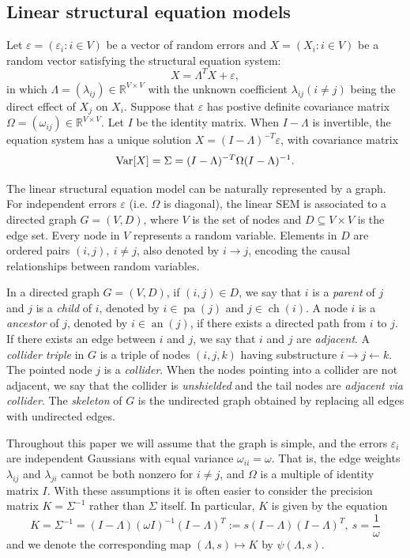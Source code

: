 \documentclass[12pt,reqno]{amsart}
\theoremstyle{plain}
\theoremstyle{definition}
\DeclareMathOperator{\pa}{pa}
\DeclareMathOperator{\an}{an}
\DeclareMathOperator{\ch}{ch}
\begin{document}
\subsection{Linear structural equation models}
Let $\varepsilon=(\varepsilon_i:i\in V)$ be a vector of random errors and $X=(X_i:i\in V)$ be a random vector satisfying the structural equation system:
$$
X=\Lambda^TX+\varepsilon,
$$
in which $\Lambda=(\lambda_{ij})\in\mathbb{R}^{V\times V}$ with the unknown coefficient $\lambda_{ij} (i\neq j)$ being the direct effect of $X_j$ on $X_i$. Suppose that $\varepsilon$ has postive definite covariance matrix $\Omega=(\omega_{ij})\in \mathbb{R}^{V\times V}$. Let $I$ be the identity matrix. When $I-\Lambda$ is invertible, the equation system has a unique solution $X=(I-\Lambda)^{-T}\varepsilon$, with covariance matrix 
$${\rm Var}[X]=\Sigma=(I-\Lambda)^{-T}\Omega(I-\Lambda)^{-1}.$$ %

The linear structural equation model can be naturally represented by a graph. For independent errors $\varepsilon$ (i.e. $\Omega$ is diagonal), the linear SEM is associated to a directed graph $G=(V,D)$, where $V$ is the set of nodes and $D\subseteq V\times V$ is the edge set. Every node in $V$ represents a random variable. Elements in $D$ are ordered pairs $(i,j),\ i\neq j$, also denoted by $i\rightarrow j$, encoding the causal relationships between random variables. 

In a directed graph $G=(V,D)$, if  $(i,j)\in D$, we say that $i$ is a \emph{parent} of $j$ and $j$ is a \emph{child} of $i$, denoted by $i\in \pa(j)$ and $j\in \ch(i)$. A node $i$ is a \emph{ancestor} of $j$, denoted by $i \in \an(j)$, if there exists a directed path from $i$ to $j$. If there exists an edge between $i$ and $j$, we say that $i$ and $j$ are \emph{adjacent}. A \emph{collider triple} in $G$ is a triple of nodes $(i,j,k)$ having substructure $i\rightarrow j \leftarrow k$. The pointed node $j$ is a \emph{collider}. When the nodes pointing into a collider are not adjacent, we say that the collider is \emph{unshielded} and the tail nodes are \emph{adjacent via collider}. The \emph{skeleton} of $G$ is the undirected graph obtained by replacing all edges with undirected edges. 

Throughout this paper we will assume that the graph is simple, and 
the errors $\varepsilon_i$ are independent Gaussians with equal variance $\omega_{ii}=\omega$. That is, the edge weights $\lambda_{ij}$ and $\lambda_{ji}$ cannot be both nonzero for $i\neq j$, and $\Omega$ is a multiple of identity matrix $I$. With these assumptions it is often easier to consider the precision matrix $K = \Sigma^{-1}$ rather than $\Sigma$ itself. In particular, $K$ is given by the equation
\[
K=\Sigma^{-1}=(I-\Lambda)(\omega I)^{-1}(I-\Lambda)^{T}:=s(I-\Lambda)(I-\Lambda)^{T},\ s=\frac{1}{\omega}
\]
and we denote the corresponding map $(\Lambda,s)\mapsto K$ by $\psi(\Lambda,s)$.
\end{document}
